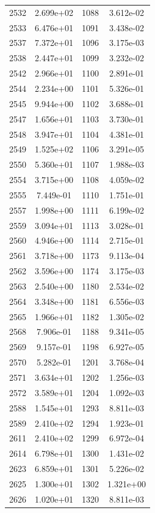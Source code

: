 \documentclass[12pt]{article}
\begin{document}
\begin{longtable}{@{}cccc@{}}
2532 & 2.699e+02 & 1088 & 3.612e-02 \\
2533 & 6.476e+01 & 1091 & 3.438e-02 \\
2537 & 7.372e+01 & 1096 & 3.175e-03 \\
2538 & 2.447e+01 & 1099 & 3.232e-02 \\
2542 & 2.966e+01 & 1100 & 2.891e-01 \\
2544 & 2.234e+00 & 1101 & 5.326e-01 \\
2545 & 9.944e+00 & 1102 & 3.688e-01 \\
2547 & 1.656e+01 & 1103 & 3.730e-01 \\
2548 & 3.947e+01 & 1104 & 4.381e-01 \\
2549 & 1.525e+02 & 1106 & 3.291e-05 \\
2550 & 5.360e+01 & 1107 & 1.988e-03 \\
2554 & 3.715e+00 & 1108 & 4.059e-02 \\
2555 & 7.449e-01 & 1110 & 1.751e-01 \\
2557 & 1.998e+00 & 1111 & 6.199e-02 \\
2559 & 3.094e+01 & 1113 & 3.028e-01 \\
2560 & 4.946e+00 & 1114 & 2.715e-01 \\
2561 & 3.718e+00 & 1173 & 9.113e-04 \\
2562 & 3.596e+00 & 1174 & 3.175e-03 \\
2563 & 2.540e+00 & 1180 & 2.534e-02 \\
2564 & 3.348e+00 & 1181 & 6.556e-03 \\
2565 & 1.966e+01 & 1182 & 1.305e-02 \\
2568 & 7.906e-01 & 1188 & 9.341e-05 \\
2569 & 9.157e-01 & 1198 & 6.927e-05 \\
2570 & 5.282e-01 & 1201 & 3.768e-04 \\
2571 & 3.634e+01 & 1202 & 1.256e-03 \\
2572 & 3.589e+01 & 1204 & 1.092e-03 \\
2588 & 1.545e+01 & 1293 & 8.811e-03 \\
2589 & 2.410e+02 & 1294 & 1.923e-01 \\
2611 & 2.410e+02 & 1299 & 6.972e-04 \\
2614 & 6.798e+01 & 1300 & 1.431e-02 \\
2623 & 6.859e+01 & 1301 & 5.226e-02 \\
2625 & 1.300e+01 & 1302 & 1.321e+00 \\
2626 & 1.020e+01 & 1320 & 8.811e-03 \\

\end{longtable}
\end{document}
